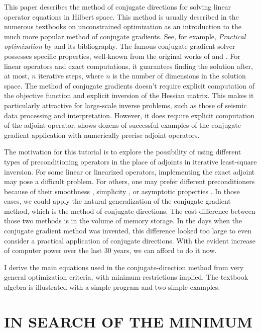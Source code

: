 This paper describes the method of conjugate directions for solving
linear operator equations in Hilbert space. This method is usually
described in the numerous textbooks on unconstrained optimization as
an introduction to the much more popular method of conjugate
gradients. See, for example, {\em Practical optimization} by
\cite{gill} and its bibliography. The famous conjugate-gradient solver
possesses specific properties, well-known from the original works of
\cite{hestenes} and \cite{fletcher}. For linear operators and exact
computations, it guarantees finding the solution after, at most, $n$
iterative steps, where $n$ is the number of dimensions in the solution
space. The method of conjugate gradients doesn't require explicit
computation of the objective function and explicit inversion of the
Hessian matrix.  This makes it particularly attractive for large-scale
inverse problems, such as those of seismic data processing and
interpretation.  However, it does require explicit computation of the
adjoint operator. \cite{Claerbout.blackwell.92,iee} shows dozens of
successful examples of the conjugate gradient application with
numerically precise adjoint operators.
\par
The motivation for this tutorial is to explore the possibility of
using different types of preconditioning operators in the place of
adjoints in iterative least-square inversion. For some linear or
linearized operators, implementing the exact adjoint may pose a
difficult problem. For others, one may prefer different
preconditioners because of their smoothness
\cite[]{Claerbout.sep.89.201,Crawley.sep.89.207}, simplicity
\cite[]{kleinman}, or asymptotic properties \cite[]{herman}. In those
cases, we could apply the natural generalization of the conjugate
gradient method, which is the method of conjugate directions. The cost
difference between those two methods is in the volume of memory
storage. In the days when the conjugate gradient method was invented,
this difference looked too large to even consider a practical
application of conjugate directions. With the evident increase of
computer power over the last 30 years, we can afford to do it now.
\par
I derive the main equations used in the conjugate-direction method
from very general optimization criteria, with minimum restrictions
implied. The textbook algebra is illustrated with a simple program and
two simple examples.

\section{IN SEARCH OF THE MINIMUM} 

